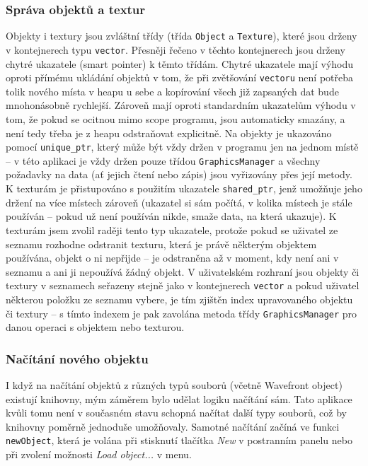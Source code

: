 \documentclass[a4paper, 12pt]{report}
\begin{document}
\subsubsection{Správa objektů a textur}
Objekty i textury jsou zvláštní třídy (třída \texttt{Object} a \texttt{Texture}), které jsou drženy v kontejnerech typu \texttt{vector}. Přesněji řečeno v těchto kontejnerech jsou drženy chytré ukazatele (smart pointer) k těmto třídám. Chytré ukazatele mají výhodu oproti přímému ukládání objektů v tom, že při zvětšování \texttt{vectoru} není potřeba tolik nového místa v heapu u sebe a kopírování všech již zapsaných dat bude mnohonásobně rychlejší. Zároveň mají oproti standardním ukazatelům výhodu v tom, že pokud se ocitnou mimo scope programu, jsou automaticky smazány, a není tedy třeba je z heapu odstraňovat explicitně. Na objekty je ukazováno pomocí \texttt{unique\_ptr}, který může být vždy držen v programu jen na jednom místě -- v této aplikaci je vždy držen pouze třídou \texttt{GraphicsManager} a všechny požadavky na data (ať jejich čtení nebo zápis) jsou vyřizovány přes její metody. K texturám je přistupováno s použitím ukazatele \texttt{shared\_ptr}, jenž umožňuje jeho držení na více místech zároveň (ukazatel si sám počítá, v kolika místech je stále používán -- pokud už není používán nikde, smaže data, na která ukazuje). K texturám jsem zvolil raději tento typ ukazatele, protože pokud se uživatel ze seznamu rozhodne odstranit texturu, která je právě některým objektem používána, objekt o ni nepřijde -- je odstraněna až v moment, kdy není ani v seznamu a ani ji nepoužívá žádný objekt. V uživatelském rozhraní jsou objekty či textury v seznamech seřazeny stejně jako v kontejnerech \texttt{vector} a pokud uživatel některou položku ze seznamu vybere, je tím zjištěn index upravovaného objektu či textury -- s tímto indexem je pak zavolána metoda třídy \texttt{GraphicsManager} pro danou operaci s objektem nebo texturou.

\subsubsection{Načítání nového objektu}
I když na načítání objektů z různých typů souborů (včetně Wavefront object) existují knihovny, mým záměrem bylo udělat logiku načítání sám. Tato aplikace kvůli tomu není v současném stavu schopná načítat další typy souborů, což by knihovny poměrně jednoduše umožňovaly. Samotné načítání začíná ve funkci \texttt{newObject}, která je volána při stisknutí tlačítka \emph{New} v postranním panelu nebo při zvolení možnosti \emph{Load object...} v menu.
\end{document}
